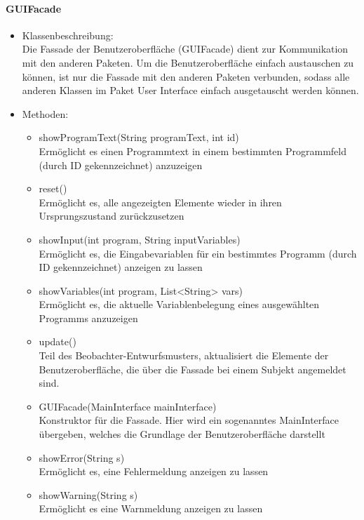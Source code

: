 \documentclass[parskip=full]{scrartcl}
\begin{document}
\paragraph{GUIFacade}
\begin{itemize}
\item Klassenbeschreibung: \\
Die Fassade der Benutzeroberfläche (GUIFacade) dient zur Kommunikation mit den anderen Paketen. Um die Benutzeroberfläche einfach austauschen zu können, ist nur die Fassade mit den anderen Paketen verbunden, sodass alle anderen Klassen im Paket User Interface einfach ausgetauscht werden können.
\item Methoden: \\
\begin{itemize}
\item showProgramText(String programText, int id)\\ Ermöglicht es einen Programmtext in einem bestimmten Programmfeld (durch ID gekennzeichnet) anzuzeigen
\item reset()\\ Ermöglicht es, alle angezeigten Elemente wieder in ihren Ursprungszustand zurückzusetzen
\item showInput(int program, String inputVariables)\\ Ermöglicht es, die Eingabevariablen für ein bestimmtes Programm (durch ID gekennzeichnet) anzeigen zu lassen
\item showVariables(int program, List<String> vars)\\ Ermöglicht es, die aktuelle Variablenbelegung eines ausgewählten Programms anzuzeigen
\item update()\\ Teil des Beobachter-Entwurfsmusters, aktualisiert die Elemente der Benutzeroberfläche, die über die Fassade bei einem Subjekt angemeldet sind.
\item GUIFacade(MainInterface mainInterface)\\ Konstruktor für die Fassade. Hier wird ein sogenanntes MainInterface übergeben, welches die Grundlage der Benutzeroberfläche darstellt
\item showError(String s)\\ Ermöglicht es, eine Fehlermeldung anzeigen zu lassen
\item showWarning(String s)\\ Ermöglicht es eine Warnmeldung anzeigen zu lassen
\end{itemize}
\end{itemize}
\end{document}

